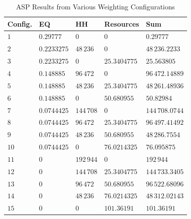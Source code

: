 \documentclass[final,journal,10pt,letterpaper,oneside,twocolumn,compsoc]%
{IEEEtran}
\begin{document}
\begin{table}[htbp]
  \caption{ASP Results from Various Weighting Configurations}
  \label{tab:13}
  \centering
    \begin{tabular}{| l | l | l | l | l |}
      \hline
      Config. & EQ & HH& Resources & Sum \\
      \hline
      $1$           & $0.29777$   & $0$      & $0$          & $0.29777$ \\
      $2$           & $0.2233275$ & $48\,236$  & $0$          & $48\,236.2233$ \\
      $3$           & $0.2233275$ & $0$      & $25.3404775$ & $25.563805$ \\
      $4$           & $0.148885$  & $96\,472$  & $0$          & $96\,472.14889$ \\
      $5$           & $0.148885$  & $48\,236$  & $25.3404775$ & $48\,261.48936$ \\
      $6$           & $0.148885$  & $0$      & $50.680955$  & $50.82984$ \\
      $7$           & $0.0744425$ & $144\,708$ & $0$          & $144\,708.0744$ \\
      $8$           & $0.0744425$ & $96\,472$  & $25.3404775$ & $96\,497.41492$ \\
      $9$           & $0.0744425$ & $48\,236$  & $50.680955$  & $48\,286.7554$ \\
      $10$          & $0.0744425$ & $0$      & $76.0214325$ & $76.095875$ \\
      $11$          & $0$         & $192\,944$ & $0$          & $192\,944$ \\
      $12$          & $0$         & $144\,708$ & $25.3404775$ & $144\,733.3405$ \\
      $13$          & $0$         & $96\,472$  & $50.680955$  & $96\,522.68096$ \\
      $14$          & $0$         & $48\,236$  & $76.0214325$ & $48\,312.02143$ \\
      $15$          & $0$         & $0$      & $101.36191$  & $101.36191$ \\
      \hline
    \end{tabular}
\end{table}
\end{document}
